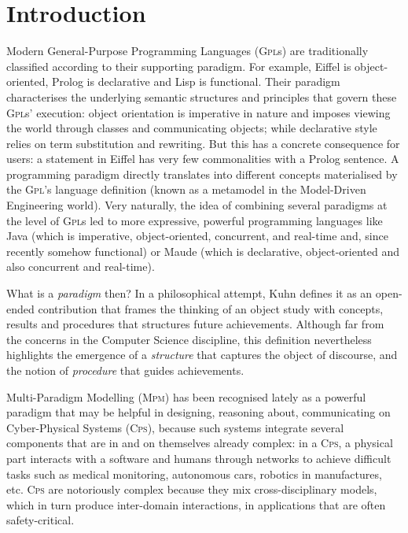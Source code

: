 \section{Introduction}
\label{sec:Introduction}


Modern General-Purpose Programming Languages (\textsc{Gpl}s) are traditionally 
classified according to their supporting paradigm. For example, Eiffel is 
object-oriented, Prolog is declarative and Lisp is functional. Their paradigm 
characterises the underlying semantic structures and principles that govern 
these \textsc{Gpl}s' execution: object orientation is imperative in nature and 
imposes viewing the world through classes and communicating objects; while 
declarative style relies on term substitution and rewriting. But this has a 
concrete consequence for users: a statement in Eiffel has very few 
commonalities with a Prolog sentence. A programming paradigm directly 
translates into different concepts materialised by the \textsc{Gpl}'s language 
definition (known as a metamodel in the Model-Driven Engineering world). Very 
naturally, the idea of combining several paradigms at the level of 
\textsc{Gpl}s led to more expressive, powerful programming languages like Java 
(which is imperative, object-oriented, concurrent, and real-time and, since 
recently somehow functional) or Maude (which is declarative, object-oriented and 
also concurrent and real-time). 

What is a \emph{paradigm} then? In a philosophical attempt, Kuhn 
\cite{B:Kuhn:2012} defines it as an open-ended contribution that frames the 
thinking of an object study with concepts, results and procedures that 
structures future achievements. Although far from the concerns in the Computer 
Science discipline, this definition nevertheless highlights the emergence of 
a \emph{structure} that captures the object of discourse, and the notion of 
\emph{procedure} that guides achievements. 

Multi-Paradigm Modelling (\textsc{Mpm}) has been recognised lately as a 
powerful paradigm that may be helpful in designing, reasoning about, 
communicating on Cyber-Physical Systems (\textsc{Cps}), because such systems 
integrate several components that are in and on themselves already complex: in 
a \textsc{Cps}, a physical part interacts with a software and humans through 
networks to achieve difficult tasks such as medical monitoring, autonomous 
cars, robotics in manufactures, etc. \textsc{Cps} are notoriously complex 
because they mix cross-disciplinary models, which in turn produce inter-domain 
interactions, in applications that are often safety-critical. 


